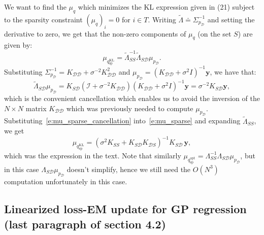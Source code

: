 \documentclass{article}
\newcommand{\dataset}{\mathcal{D}}
\begin{document}
We want to find the $\mu_q$ which minimizes the KL expression given in (21) subject to the sparsity constraint $(\mu_q)_i=0$ for $i \in T$. Writing $\tilde{\Lambda} \doteq \Sigma_{p_\dataset}^{-1}$ and setting the derivative to zero, we get that the non-zero components of $\mu_q$ (on the set $S$) are given by:
    \begin{equation} \label{e:mu_sparse}
        \mu_{q_{\mathrm{sp}}^{\mathrm{KL}}} = \tilde{\Lambda}_{SS}^{-1}\tilde{\Lambda}_{S\dataset}\mu_{p_{\dataset}}.
    \end{equation}
Substituting $\Sigma_{p_\dataset}^{-1} = K_{\dataset\dataset} + \sigma^{-2} K_{\dataset\dataset}^2$ and $\mu_{p_\dataset} = (K_{\dataset\dataset}+\sigma^2 I)^{-1} \mathbf{y}$, we have that:
    \begin{equation} \label{e:mu_sparse_cancellation}
        \tilde{\Lambda}_{S\dataset}\mu_{p_{\dataset}} = K_{S\dataset} (\mathcal{I} + \sigma^{-2} K_{\dataset\dataset}) (K_{\dataset\dataset}+\sigma^2 I)^{-1} \mathbf{y} = \sigma^{-2} K_{S\dataset} \mathbf{y},
    \end{equation}
which is the convenient cancellation which enables us to avoid the inversion of the $N\times N$ matrix $K_{\dataset\dataset}$ which was previously needed to compute $\mu_{p_\dataset}$. Substituting~\eqref{e:mu_sparse_cancellation} into~\eqref{e:mu_sparse} and expanding $\tilde{\Lambda}_{SS}$, we get
$$
  \mu_{q_{\mathrm{sp}}^{\mathrm{KL}}} =  \left( \sigma^2 K_{SS} +  K_{S\dataset} K_{\dataset S}\right)^{-1} K_{S\dataset}\, \mathbf{y},
$$
which was the expression in the text. Note that similarly $\mu_{q_{\mathrm{sp}}^{\mathrm{opt}}} = \Lambda_{SS}^{-1}\Lambda_{S\dataset}\mu_{p_{\dataset}}$, but in this case $\Lambda_{S\dataset}\mu_{p_{\dataset}}$ doesn't simplify, hence we still need the $O(N^3)$ computation unfortunately in this case.

\subsection{Linearized loss-EM update for GP regression (last paragraph of section 4.2)}
\end{document}
